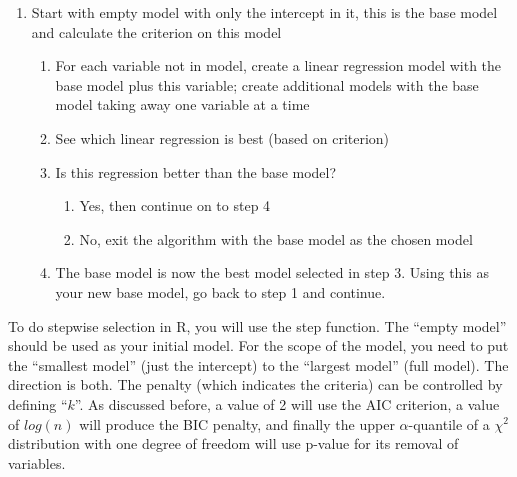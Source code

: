 \documentclass[
  letterpaper,
  DIV=11,
  numbers=noendperiod]{scrreprt}
\providecommand{\tightlist}{%
  \setlength{\itemsep}{0pt}\setlength{\parskip}{0pt}}\usepackage{longtable,booktabs,array}
\begin{document}
\begin{enumerate}
\def\labelenumi{\arabic{enumi}.}
\setcounter{enumi}{-1}
\tightlist
\item
  Start with empty model with only the intercept in it, this is the base
  model and calculate the criterion on this model\\

  \begin{enumerate}
  \def\labelenumii{\arabic{enumii}.}
  \tightlist
  \item
    For each variable not in model, create a linear regression model
    with the base model plus this variable; create additional models
    with the base model taking away one variable at a time\\
  \item
    See which linear regression is best (based on criterion)\\
  \item
    Is this regression better than the base model?\\

    \begin{enumerate}
    \def\labelenumiii{\alph{enumiii}.}
    \tightlist
    \item
      Yes, then continue on to step 4\\
    \item
      No, exit the algorithm with the base model as the chosen model\\
    \end{enumerate}
  \item
    The base model is now the best model selected in step 3. Using this
    as your new base model, go back to step 1 and continue.\\
  \end{enumerate}
\end{enumerate}

To do stepwise selection in R, you will use the step function. The
``empty model'' should be used as your initial model. For the scope of
the model, you need to put the ``smallest model'' (just the intercept)
to the ``largest model'' (full model). The direction is both. The
penalty (which indicates the criteria) can be controlled by defining
``\(k\)''. As discussed before, a value of 2 will use the AIC criterion,
a value of \(log(n)\) will produce the BIC penalty, and finally the
upper \(\alpha\)-quantile of a \(\chi^{2}\) distribution with one degree
of freedom will use p-value for its removal of variables.
\end{document}
